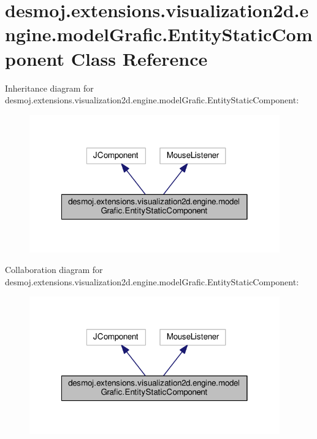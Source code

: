 \section{desmoj.\-extensions.\-visualization2d.\-engine.\-model\-Grafic.\-Entity\-Static\-Component Class Reference}
\label{classdesmoj_1_1extensions_1_1visualization2d_1_1engine_1_1model_grafic_1_1_entity_static_component}


Inheritance diagram for desmoj.\-extensions.\-visualization2d.\-engine.\-model\-Grafic.\-Entity\-Static\-Component\-:
\nopagebreak
\begin{figure}[H]
\begin{center}
\leavevmode
\includegraphics[width=306pt]{classdesmoj_1_1extensions_1_1visualization2d_1_1engine_1_1model_grafic_1_1_entity_static_component__inherit__graph}
\end{center}
\end{figure}


Collaboration diagram for desmoj.\-extensions.\-visualization2d.\-engine.\-model\-Grafic.\-Entity\-Static\-Component\-:
\nopagebreak
\begin{figure}[H]
\begin{center}
\leavevmode
\includegraphics[width=306pt]{classdesmoj_1_1extensions_1_1visualization2d_1_1engine_1_1model_grafic_1_1_entity_static_component__coll__graph}
\end{center}
\end{figure}
